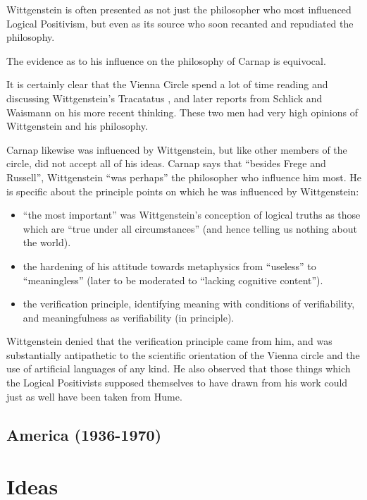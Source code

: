 \documentclass[10pt,titlepage]{book}
\begin{document}
Wittgenstein is often presented as not just the philosopher who most influenced Logical Positivism, but even as its source who soon recanted and repudiated the philosophy.

The evidence as to his influence on the philosophy of Carnap is equivocal.

It is certainly clear that the Vienna Circle spend a lot of time reading and discussing Wittgenstein's Tracatatus \cite{wittgenstein1921}, and later reports from Schlick and Waismann  on his more recent thinking.
These two men had very high opinions of Wittgenstein and his philosophy.

Carnap likewise was influenced by Wittgenstein, but like other members of the circle, did not accept all of his ideas.
Carnap says that ``besides Frege and Russell'', Wittgenstein ``was perhaps'' the philosopher who influence him most.
He is specific about the principle points on which he was influenced by Wittgenstein:

\begin{itemize}
\item ``the most important'' was Wittgenstein's conception of logical truths as those which are ``true under all circumstances'' (and hence telling us nothing about the world).
\item  the hardening of his attitude towards metaphysics from ``useless'' to ``meaningless'' (later to be moderated to ``lacking cognitive content'').
\item the verification principle, identifying meaning with conditions of verifiability, and meaningfulness as verifiability (in principle).
\end{itemize}

Wittgenstein denied that the verification principle came from him, and was substantially antipathetic to the scientific orientation of the Vienna circle and the use of artificial languages of any kind.
He also observed that those things which the Logical Positivists supposed themselves to have drawn from his work could just as well have been taken from Hume.

\subsection{America (1936-1970)}

\section{Ideas}
\end{document}
